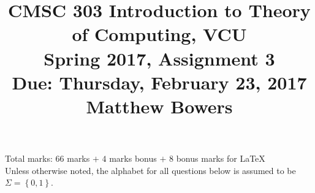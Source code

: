 \documentclass{article}
\newcommand{\set}[1]{{\left\{#1\right\}}}    %
\begin{document}
\title{CMSC 303 Introduction to Theory of Computing, VCU\\Spring 2017, Assignment 3\\Due: Thursday, February 23, 2017\\Matthew Bowers}
\date{}
\maketitle
\noindent Total marks: $66$ marks $+$ $4$ marks bonus $+$ $8$ bonus marks for LaTeX\\

\noindent Unless otherwise noted, the alphabet for all questions below is assumed to be $\Sigma=\set{0,1}$.
\end{document}
